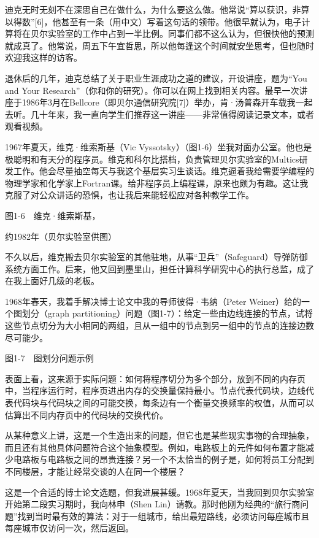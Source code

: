 \documentclass[a4paper,12pt,UTF8,twoside]{ctexbook}
\begin{document}
迪克无时无刻不在深思自己在做什么，为什么要这么做。他常说“算以获识，非算以得数”[6]，他甚至有一条（用中文）写着这句话的领带。他很早就认为，电子计算将在贝尔实验室的工作中占到一半比例。同事们都不这么认为，但很快他的预测就成真了。他常说，周五下午宜哲思，所以他每逢这个时间就安坐思考，但也随时欢迎我这样的访客。

退休后的几年，迪克总结了关于职业生涯成功之道的建议，开设讲座，题为“You and Your Research”（你和你的研究）。你可以在网上找到相关内容。最早一次讲座于1986年3月在Bellcore（即贝尔通信研究院[7]）举办，肯·汤普森开车载我一起去听。几十年来，我一直向学生们推荐这一讲座——非常值得阅读记录文本，或者观看视频。

1967年夏天，维克·维索斯基（Vic Vyssotsky）（图1-6）坐我对面办公室。他也是极聪明和有天分的程序员。维克和科尔比搭档，负责管理贝尔实验室的Multics研发工作。他会尽量抽空每天与我这个基层实习生谈话。维克逼着我给需要学编程的物理学家和化学家上Fortran课。给非程序员上编程课，原来也颇为有趣。这让我克服了对公众讲话的恐惧，也让我后来能轻松应对各种教学工作。



图1-6　维克·维索斯基，

约1982年（贝尔实验室供图）

不久以后，维克搬去贝尔实验室的其他驻地，从事“卫兵”（Safeguard）导弹防御系统方面工作。后来，他又回到墨里山，担任计算科学研究中心的执行总监，成了在我上面好几级的老板。

1968年春天，我着手解决博士论文中我的导师彼得·韦纳（Peter Weiner）给的一个图划分（graph partitioning）问题（图1-7）：给定一些由边线连接的节点，试将这些节点切分为大小相同的两组，且从一组中的节点到另一组中的节点的连接边数尽可能少。



图1-7　图划分问题示例

表面上看，这来源于实际问题：如何将程序切分为多个部分，放到不同的内存页中，当程序运行时，程序页进出内存的交换量保持最小。节点代表代码块，边线代表代码块与代码块之间的可能交换，每条边有一个衡量交换频率的权值，从而可以估算出不同内存页中的代码块的交换代价。

从某种意义上讲，这是一个生造出来的问题，但它也是某些现实事物的合理抽象，而且还有其他具体问题符合这个抽象模型。例如，电路板上的元件如何布置才能减少电路板与电路板之间的昂贵连接？另一个不太恰当的例子是，如何将员工分配到不同楼层，才能让经常交谈的人在同一个楼层？

这是一个合适的博士论文选题，但我进展甚缓。1968年夏天，当我回到贝尔实验室开始第二段实习期时，我向林申（Shen Lin）请教。那时他刚为经典的“旅行商问题”找到当时最有效的算法：对于一组城市，给出最短路线，必须访问每座城市且每座城市仅访问一次，然后返回。
\end{document}
